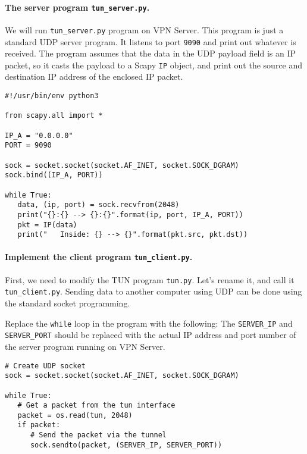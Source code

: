 \paragraph{The server program \texttt{tun\_server.py}.}
We will run \texttt{tun\_server.py} program on VPN Server.
This program is just a standard UDP server program. It 
listens to port \texttt{9090} and print out whatever is 
received.  The program assumes that the data in the UDP payload 
field is an IP packet, so it 
casts the payload to a Scapy \texttt{IP} object, and print out 
the source and destination IP address of the enclosed IP packet. 


\begin{lstlisting}[caption={\texttt{tun\_server.py}}, label=vpn:list:tun_server]
#!/usr/bin/env python3

from scapy.all import *

IP_A = "0.0.0.0"
PORT = 9090

sock = socket.socket(socket.AF_INET, socket.SOCK_DGRAM)
sock.bind((IP_A, PORT))

while True:
   data, (ip, port) = sock.recvfrom(2048)
   print("{}:{} --> {}:{}".format(ip, port, IP_A, PORT))
   pkt = IP(data)
   print("   Inside: {} --> {}".format(pkt.src, pkt.dst))
\end{lstlisting}



\paragraph{Implement the client program \texttt{tun\_client.py}.}
First, we need to modify the TUN program \texttt{tun.py}. Let's rename it, and call it 
\texttt{tun\_client.py}.  Sending data to another computer using UDP
can be done using the standard socket programming. 

Replace the \texttt{while} loop in the program with the following: 
The \texttt{SERVER\_IP} and \texttt{SERVER\_PORT} should be   
replaced with the actual IP address and port number of the server program running
on VPN Server.

\begin{lstlisting}
# Create UDP socket
sock = socket.socket(socket.AF_INET, socket.SOCK_DGRAM)

while True:
   # Get a packet from the tun interface
   packet = os.read(tun, 2048)
   if packet:
      # Send the packet via the tunnel
      sock.sendto(packet, (SERVER_IP, SERVER_PORT))
\end{lstlisting}




